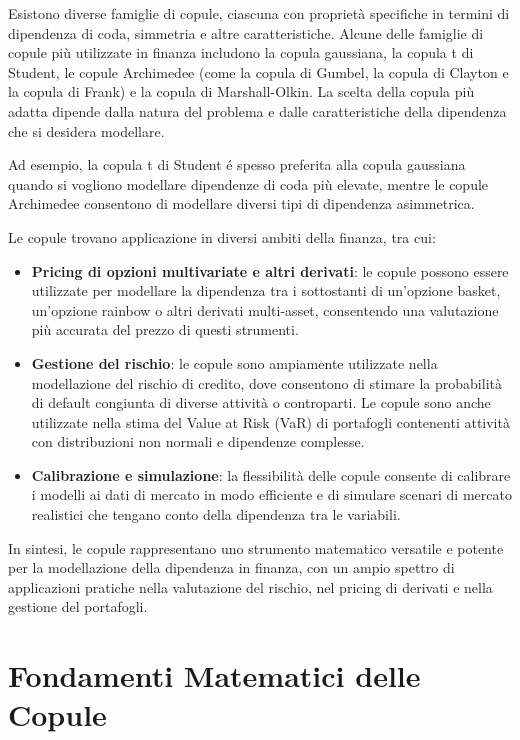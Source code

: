 \documentclass[%
	corpo=11pt,
    twoside,
    stile=classica,
    oldstyle,
    tipotesi=custom,
    greek,
    evenboxes,
]{toptesi}
\begin{document}
Esistono diverse famiglie di copule, ciascuna con proprietà specifiche in termini di dipendenza di coda, simmetria e altre caratteristiche. Alcune delle famiglie di copule più utilizzate in finanza includono la copula gaussiana, la copula t di Student, le copule Archimedee (come la copula di Gumbel, la copula di Clayton e la copula di Frank) e la copula di Marshall-Olkin. La scelta della copula più adatta dipende dalla natura del problema e dalle caratteristiche della dipendenza che si desidera modellare.

Ad esempio, la
copula t di Student é spesso preferita alla copula gaussiana quando si vogliono
modellare dipendenze di coda più
elevate, mentre le copule Archimedee consentono di modellare diversi tipi di dipendenza asimmetrica.

Le copule trovano applicazione in diversi ambiti della finanza, tra cui:

\begin{itemize}
	\item \textbf{Pricing di opzioni multivariate e altri derivati}: le copule possono essere utilizzate per modellare la dipendenza tra i sottostanti di un’opzione basket, un’opzione rainbow o altri derivati multi-asset, consentendo una valutazione più accurata del prezzo di questi strumenti.
	
	\item \textbf{Gestione del rischio}: le copule sono ampiamente utilizzate nella modellazione del rischio di credito, dove consentono di stimare la probabilità di default congiunta di diverse attività o controparti. Le copule sono anche utilizzate nella stima del Value at Risk (VaR) di portafogli contenenti attività con distribuzioni non normali e dipendenze complesse.
	
	\item \textbf{Calibrazione e simulazione}: la flessibilità delle copule consente di calibrare i modelli ai dati di mercato in modo efficiente e di simulare scenari di mercato realistici che tengano conto della dipendenza tra le variabili.
\end{itemize}

In sintesi, le copule rappresentano uno strumento matematico versatile e potente per la modellazione della dipendenza in finanza, con un ampio spettro di applicazioni pratiche nella valutazione del rischio, nel pricing di derivati e nella gestione del portafogli.


\chapter{Fondamenti Matematici delle Copule}
\end{document}
